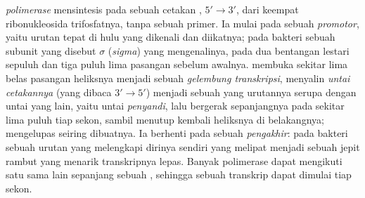 \begin{definition}\label{def:b1:gene-expression:transcription}
\emph{ polimerase} mensintesis  pada sebuah cetakan ,
$5' \to 3'$, dari keempat ribonukleosida trifosfatnya, tanpa sebuah
primer. Ia mulai pada sebuah \emph{promotor}, yaitu urutan tepat di
hulu  yang dikenali dan diikatnya; pada bakteri sebuah subunit
yang disebut $\sigma$ (\emph{sigma}) yang mengenalinya, pada dua
bentangan lestari sepuluh dan tiga puluh lima pasangan sebelum
awalnya.  membuka sekitar lima belas pasangan heliksnya menjadi
sebuah \emph{gelembung transkripsi}, menyalin \emph{untai cetakannya}
(yang dibaca $3' \to 5'$) menjadi sebuah  yang urutannya serupa
dengan untai yang lain, yaitu untai \emph{penyandi}, lalu bergerak
sepanjangnya pada sekitar lima puluh  tiap sekon, sambil
menutup kembali heliksnya di belakangnya;  mengelupas seiring
dibuatnya. Ia berhenti pada sebuah \emph{pengakhir}: pada bakteri
sebuah urutan yang melengkapi dirinya sendiri yang  melipat
menjadi sebuah jepit rambut yang menarik transkripnya lepas. Banyak
polimerase dapat mengikuti satu sama lain sepanjang sebuah ,
sehingga sebuah transkrip dapat dimulai tiap sekon.
\end{definition}

